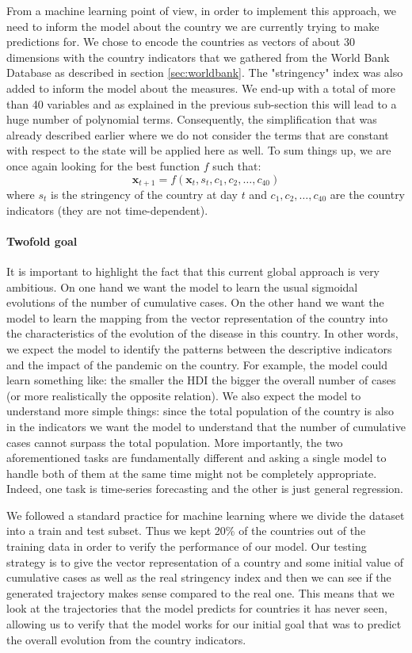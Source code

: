 \documentclass[12pt, letterpaper]{article}
\begin{document}
From a machine learning point of view, in order to implement this approach, we need to inform the model about the country we are currently trying to make predictions for.
We chose to encode the countries as vectors of about 30 dimensions with the country indicators that we gathered from the World Bank Database as described in section \ref{sec:worldbank}.
The "stringency" index was also added to inform the model about the measures.
We end-up with a total of more than 40 variables and as explained in the previous sub-section this will lead to a huge number of polynomial terms.
Consequently, the simplification that was already described earlier where we do not consider the terms that are constant with respect to the state will be applied here as well.
To sum things up, we are once again looking for the best function $f$ such that:
$$\mathbf{x}_{t+1} = f(\mathbf{x}_t, s_t, c_1, c_2, \dots, c_{40})$$
where $s_t$ is the stringency of the country at day $t$ and $c_1, c_2, \dots, c_{40}$ are the country indicators (they are not time-dependent).

\paragraph{Twofold goal} 
It is important to highlight the fact that this current global approach is very ambitious.
On one hand we want the model to learn the usual sigmoidal evolutions of the number of cumulative cases.
On the other hand we want the model to learn the mapping from the vector representation of the country into the characteristics of the evolution of the disease in this country. 
In other words, we expect the model to identify the patterns between the descriptive indicators and the impact of the pandemic on the country.
For example, the model could learn something like: the smaller the HDI the bigger the overall number of cases (or more realistically the opposite relation). 
We also expect the model to understand more simple things: since the total population of the country is also in the indicators we want the model to understand that the number of cumulative cases cannot surpass the total population. 
More importantly, the two aforementioned tasks are fundamentally different and asking a single model to handle both of them at the same time might not be completely appropriate.
Indeed, one task is time-series forecasting and the other is just general regression.


We followed a standard practice for machine learning where we divide the dataset into a train and test subset. 
Thus we kept 20\% of the countries out of the training data in order to verify the performance of our model.
Our testing strategy is to give the vector representation of a country and some initial value of cumulative cases as well as the real stringency index and then we can see if the generated trajectory makes sense compared to the real one.
This means that we look at the trajectories that the model predicts for countries it has never seen, allowing us to verify that the model works for our initial goal that was to predict the overall evolution from the country indicators.
\end{document}
